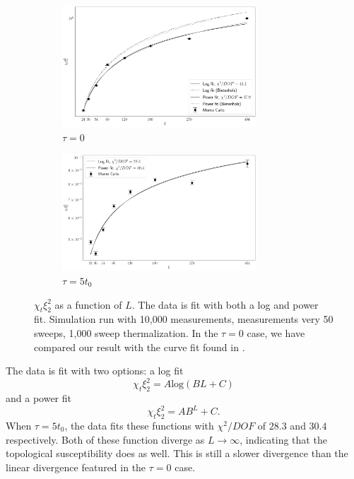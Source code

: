\begin{figure}[h]
    \begin{center}
      \begin{subfigure}[b]{\textwidth}
          \includegraphics[width=0.8\textwidth]{imgs/divergence.png}
          \caption{$\tau = 0$}
      \end{subfigure}

      \begin{subfigure}[b]{\textwidth}
          \includegraphics[width=0.8\textwidth]{imgs/divergence_flowed.png}
          \caption{$\tau = 5t_0$}
      \end{subfigure}
      \caption{\label{fig:bietenholz} $\chi_t\xi_2^2$ as a function of $L$. The data is fit with both a log and power fit. Simulation run with 10,000 measurements, measurements very 50 sweeps, 1,000 sweep thermalization. In the $\tau=0$ case, we have compared our result with the curve fit found in \cite{bietenholz2018}.}
    \end{center}
\end{figure}
The data is fit with two options: a log fit
\begin{equation}
    \chi_t \xi_2^2 = A \mathrm{log}(B L + C)
\end{equation}
and a power fit
\begin{equation}
    \chi_t \xi_2^2 = A B^L + C.
\end{equation}
When $\tau=5t_0$, the data fits these functions with $\chi^2/DOF$ of $28.3$ and $30.4$ respectively. Both of these function diverge as $L\rightarrow \infty$, indicating that the topological susceptibility does as well. This is still a slower divergence than the linear divergence featured in the $\tau=0$ case.


